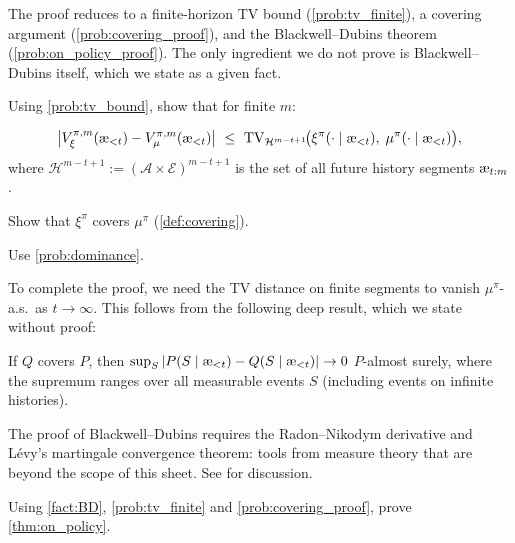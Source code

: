 \documentclass[fontsize=11pt, parskip=half]{scrartcl}
\newcommand{\cA}{\mathcal{A}}
\newcommand{\cE}{\mathcal{E}}
\newcommand{\cH}{\mathcal{H}}
\newcommand{\TV}[1][]{\mathrm{TV}_{#1}}
\newcommand{\aes}{\textnormal{\ae}}
\begin{document}
The proof reduces to a finite-horizon TV bound (\cref{prob:tv_finite}), a covering argument (\cref{prob:covering_proof}), and the Blackwell--Dubins theorem (\cref{prob:on_policy_proof}).
The only ingredient we do not prove is Blackwell--Dubins itself, which we state as a given fact.

\begin{exercise}
\label{prob:tv_finite}
Using \cref{prob:tv_bound}, show that for finite $m$:

\[
    \big|V_\xi^{\pi,m}(\aes_{<t}) - V_\mu^{\pi,m}(\aes_{<t})\big|
    ~\leq~ \TV[\cH^{m-t+1}]\!\big(\xi^\pi(\cdot \mid \aes_{<t}),\; \mu^\pi(\cdot \mid \aes_{<t})\big),
\]
where $\cH^{m-t+1} := (\cA \times \cE)^{m-t+1}$ is the set of all future history segments $\aes_{t:m}$.
\end{exercise}


\begin{exercise}[Covering]
\label{prob:covering_proof}
Show that $\xi^\pi$ covers $\mu^\pi$ (\cref{def:covering}).


\begin{hint}
Use \cref{prob:dominance}.
\end{hint}
\end{exercise}


To complete the proof, we need the TV distance on finite segments to vanish $\mu^\pi$-a.s.\ as $t \to \infty$.
This follows from the following deep result, which we state without proof:

\begin{fact}\label{fact:BD}
If $Q$ covers $P$, then
$\sup_S |P(S \mid \aes_{<t}) - Q(S \mid \aes_{<t})| \to 0$ $P$-almost surely,
where the supremum ranges over all measurable events $S$ (including events on infinite histories).
\end{fact}

The proof of Blackwell--Dubins requires the Radon--Nikodym derivative and L\'{e}vy's martingale convergence theorem: tools from measure theory that are beyond the scope of this sheet.
See \cite[Chapter~3.9]{Hutter:24uaibook2} for discussion.

\begin{exercise}
\label{prob:on_policy_proof}
Using \cref{fact:BD}, \cref{prob:tv_finite} and \cref{prob:covering_proof}, prove \cref{thm:on_policy}.

\end{exercise}
\end{document}
